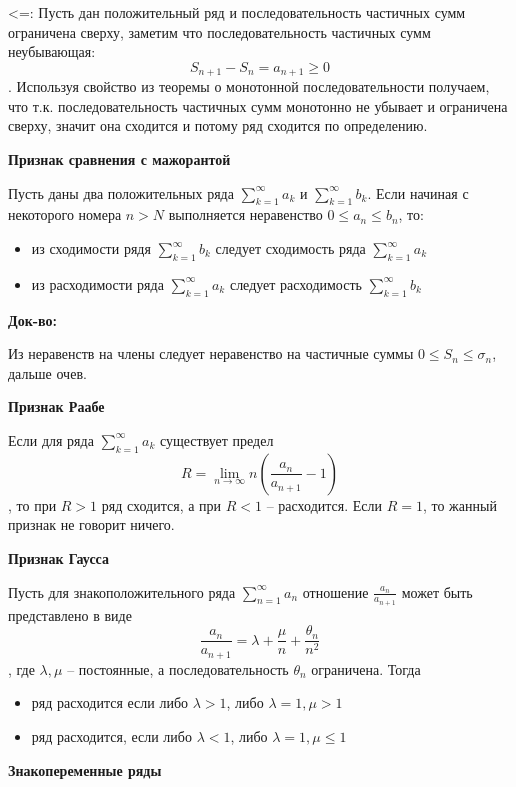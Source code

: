 \documentclass{article}
\begin{document}
<=: Пусть дан положительный ряд и последовательность частичных сумм ограничена сверху, заметим что последовательность частичных сумм неубывающая:
$$S_{n + 1} - S_{n} = a_{n + 1} \ge 0$$. Используя свойство из теоремы о монотонной последовательности получаем, что т.к. последовательность частичных сумм монотонно не убывает и ограничена сверху, значит она сходится и потому ряд сходится по определению.

{\bf Признак сравнения с мажорантой}

Пусть даны два положительных ряда $\sum\limits_{k=1}^{\infty} a_{k}$ и $\sum\limits_{k=1}^{\infty} b_{k}$. Если начиная с некоторого номера $n > N$ выполняется неравенство $0 \le a_n \le b_n$, то:

\begin{itemize}
	\item из сходимости рядя $\sum\limits_{k=1}^{\infty} b_{k}$ следует сходимость ряда $\sum\limits_{k=1}^{\infty} a_{k}$
	\item из расходимости ряда $\sum\limits_{k=1}^{\infty} a_{k}$ следует расходимость $\sum\limits_{k=1}^{\infty} b_{k}$
\end{itemize}

{\bf Док-во:}

Из неравенств на члены следует неравенство на частичные суммы $0 \le S_n \le \sigma_n$, дальше очев.


{\bf Признак Раабе}

Если для ряда $\sum\limits_{k=1}^{\infty} a_{k}$ существует предел $$R = \lim\limits_{n \rightarrow \infty} n (\frac{a_n}{a_{n+1}} - 1)$$, то при $R > 1$ ряд сходится, а при $R < 1$ -- расходится. Если $R = 1$, то жанный признак не говорит ничего.

{\bf Признак Гаусса}

Пусть для знакоположительного ряда $\sum\limits_{n=1}^{\infty} a_{n}$ отношение $\frac{a_n}{a_{n + 1}}$ может быть представлено в виде $$\frac{a_n}{a_{n + 1}} = \lambda + \frac{\mu}{n} + \frac{\theta_n}{n^2}$$, где $\lambda, \mu$ -- постоянные, а последовательность $\theta_n$ ограничена. Тогда 
\begin{itemize}
	\item ряд расходится если либо $\lambda > 1$, либо $\lambda = 1, \mu > 1$
	\item ряд расходится, если либо $\lambda < 1$, либо $\lambda = 1, \mu \le 1$
\end{itemize}


{\bf Знакопеременные ряды}

\end{document}
